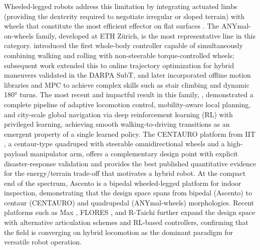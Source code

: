 \documentclass[preprint,12pt]{elsarticle}
\begin{document}
Wheeled-legged robots address this limitation by integrating actuated limbs (providing the dexterity required to negotiate irregular or sloped terrain) with wheels that constitute the most efficient effector on flat surfaces \citep{Bjelonic2022Survey}. The ANYmal-on-wheels family, developed at ETH Z\"{u}rich, is the most representative line in this category. \citet{Bjelonic2019KeepRollin} introduced the first whole-body controller capable of simultaneously combining walking and rolling with non-steerable torque-controlled wheels; subsequent work \citep{bjelonic2019} extended this to online trajectory optimization for hybrid maneuvers validated in the DARPA SubT, and \citet{Bjelonic2022OfflineMotion} later incorporated offline motion libraries and MPC to achieve complex skills such as stair climbing and dynamic 180° turns. The most recent and impactful result in this family, \citet{Lee2024Science}, demonstrated a complete pipeline of adaptive locomotion control, mobility-aware local planning, and city-scale global navigation via deep reinforcement learning (RL) with privileged learning, achieving smooth walking-to-driving transitions as an emergent property of a single learned policy. The CENTAURO platform from IIT \citep{Kashiri2019CENTAURO,Klamt2019CENTAURO}, a centaur-type quadruped with steerable omnidirectional wheels and a high-payload manipulator arm, offers a complementary design point with explicit disaster-response validation and provides the best published quantitative evidence for the energy/terrain trade-off that motivates a hybrid robot. At the compact end of the spectrum, Ascento \citep{Klemm2019Ascento,Klemm2020AscentoRAL} is a bipedal wheeled-legged platform for indoor inspection, demonstrating that the design space spans from bipedal (Ascento) to centaur (CENTAURO) and quadrupedal (ANYmal-wheels) morphologies. Recent platforms such as Max \citep{Liu2024Max}, FLORES \citep{Cui2025FLORES}, and R-Taichi \citep{Jiang2025RTaichi} further expand the design space with alternative articulation schemes and RL-based controllers, confirming that the field is converging on hybrid locomotion as the dominant paradigm for versatile robot operation.
\end{document}
